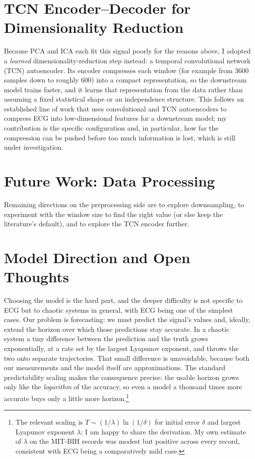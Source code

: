 \documentclass[11pt,a4paper]{article}
\begin{document}
\section{TCN Encoder--Decoder for Dimensionality Reduction}
\label{sec:tcn}

Because PCA and ICA each fit this signal poorly for the reasons above, I adopted a
\emph{learned} dimensionality-reduction step instead: a temporal convolutional network (TCN)
autoencoder. Its encoder compresses each window (for example from $3600$ samples down to
roughly $600$) into a compact representation, so the downstream model trains faster, and it
learns that representation from the data rather than assuming a fixed statistical shape or an
independence structure. This follows an established line of work that uses convolutional and
TCN autoencoders to compress ECG into low-dimensional features for a downstream
model; my contribution is the specific configuration and, in particular, how far the
compression can be pushed before too much information is lost, which is still under
investigation.

\section{Future Work: Data Processing}

Remaining directions on the preprocessing side are to explore downsampling, to experiment with
the window size to find the right value (or else keep the literature's default), and to explore
the TCN encoder further.

\section{Model Direction and Open Thoughts}

Choosing the model is the hard part, and the deeper difficulty is not specific to ECG but to
chaotic systems in general, with ECG being one of the simplest cases. Our problem is
forecasting: we must predict the signal's values and, ideally, extend the horizon over which
those predictions stay accurate. In a chaotic system a tiny difference between the prediction
and the truth grows exponentially, at a rate set by the largest Lyapunov exponent, and throws
the two onto separate trajectories. That small difference is unavoidable, because both our
measurements and the model itself are approximations. The standard predictability scaling makes
the consequence precise: the usable horizon grows only like the \emph{logarithm} of the
accuracy, so even a model a thousand times more accurate buys only a little more
horizon.\footnote{The relevant scaling is $T \sim (1/\lambda)\ln(1/\delta)$ for initial error
$\delta$ and largest Lyapunov exponent $\lambda$; I am happy to share the derivation. My own
estimate of $\lambda$ on the MIT-BIH records was modest but positive across every record,
consistent with ECG being a comparatively mild case.}
\end{document}
